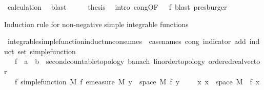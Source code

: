 \begin{isabellebody}
\ calculation\ \isamarkupfalse%
\ blast\isanewline
\ \ \isamarkupfalse%
\ \isamarkupfalse%
\ {\isacharquery}{\kern0pt}thesis\ \isamarkupfalse%
\ {\isacharparenleft}{\kern0pt}intro\ cong{\isacharbrackleft}{\kern0pt}OF\ {\isacharunderscore}{\kern0pt}\ {\isacharunderscore}{\kern0pt}\ f{\isacharparenleft}{\kern0pt}{}{\isacharcomma}{\kern0pt}{}{\isacharparenright}{\kern0pt}{\isacharbrackright}{\kern0pt}{\isacharcomma}{\kern0pt}\ blast{\isacharcomma}{\kern0pt}\ presburger{\isacharplus}{\kern0pt}{\isacharparenright}{\kern0pt}\ \isanewline
{}\isamarkupfalse%
%
\endisatagproof
{\isafoldproof}%
%
\isadelimproof
%
\endisadelimproof
%
\begin{isamarkuptext}%
Induction rule for non-negative simple integrable functions%
\end{isamarkuptext}\isamarkuptrue%
%
\isadelimimportant
%
\endisadelimimportant
%
\isatagimportant
{}\isamarkupfalse%
\ integrable{\isacharunderscore}{\kern0pt}simple{\isacharunderscore}{\kern0pt}function{\isacharunderscore}{\kern0pt}induct{\isacharunderscore}{\kern0pt}nn{\isacharbrackleft}{\kern0pt}consumes\ {}{\isacharcomma}{\kern0pt}\ case{\isacharunderscore}{\kern0pt}names\ cong\ indicator\ add{\isacharcomma}{\kern0pt}\ induct\ set{\isacharcolon}{\kern0pt}\ simple{\isacharunderscore}{\kern0pt}function{\isacharbrackright}{\kern0pt}{\isacharcolon}{\kern0pt}\isanewline
\ \ \ f\ {\isacharcolon}{\kern0pt}{\isacharcolon}{\kern0pt}\ {\isachardoublequoteopen}{\isacharprime}{\kern0pt}a\ {\isasymRightarrow}\ {\isacharprime}{\kern0pt}b\ {\isacharcolon}{\kern0pt}{\isacharcolon}{\kern0pt}\ {\isacharbraceleft}{\kern0pt}second{\isacharunderscore}{\kern0pt}countable{\isacharunderscore}{\kern0pt}topology{\isacharcomma}{\kern0pt}\ banach{\isacharcomma}{\kern0pt}\ linorder{\isacharunderscore}{\kern0pt}topology{\isacharcomma}{\kern0pt}\ ordered{\isacharunderscore}{\kern0pt}real{\isacharunderscore}{\kern0pt}vector{\isacharbraceright}{\kern0pt}{\isachardoublequoteclose}\isanewline
\ \ \ f{\isacharcolon}{\kern0pt}\ {\isachardoublequoteopen}simple{\isacharunderscore}{\kern0pt}function\ M\ f{\isachardoublequoteclose}\ {\isachardoublequoteopen}emeasure\ M\ {\isacharbraceleft}{\kern0pt}y\ {\isasymin}\ space\ M{\isachardot}{\kern0pt}\ f\ y\ {\isasymnoteq}\ {}{\isacharbraceright}{\kern0pt}\ {\isasymnoteq}\ {\isasyminfinity}{\isachardoublequoteclose}\ {\isachardoublequoteopen}{\isasymAnd}x{\isachardot}{\kern0pt}\ x\ {\isasymin}\ space\ M\ {\isasymlongrightarrow}\ f\ x\ {\isasymge}\ {}{\isachardoublequoteclose}\isanewline

\end{isabellebody}

